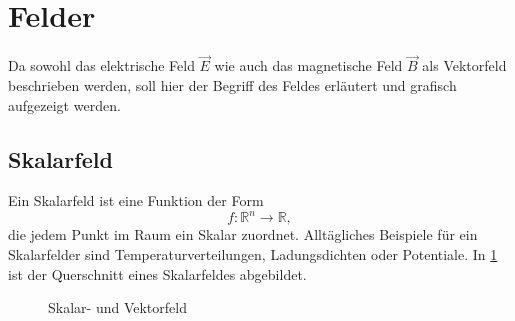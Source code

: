 %
%
% 
%
%
\section{Felder\label{maxwell:mathFormulierung}}

Da sowohl das elektrische Feld $\vec{E}$ wie auch das magnetische Feld $\vec{B}$ als Vektorfeld beschrieben werden, soll hier der Begriff des Feldes erläutert und grafisch aufgezeigt werden.

\subsection{Skalarfeld\label{maxwell:skalarfeld}}

Ein Skalarfeld ist eine Funktion der Form
\[ f:\mathbb{R}^n \rightarrow \mathbb{R}, \] 
die jedem Punkt im Raum ein Skalar zuordnet.
Alltägliches Beispiele für ein Skalarfelder sind Temperaturverteilungen, Ladungsdichten oder Potentiale. In \ref{maxwell:skalarGrad} ist der Querschnitt eines Skalarfeldes abgebildet.



\begin{figure}
	\centering
	\caption{Skalar- und Vektorfeld}
	\label{maxwell:skalarGrad}
\end{figure}

